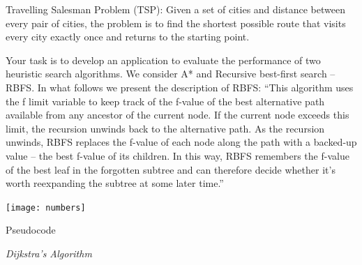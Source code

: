 \documentclass[12pt, a4paper]{article}
\begin{document}
\vspace{20mm}
\begin{flushleft}
\hspace{5mm}
\large
Travelling Salesman Problem (TSP): Given a set of cities and distance between every pair of cities, the problem is to find the shortest possible route that visits every city exactly once and returns to the starting point.
\end{flushleft}

\large
\vspace{5mm}
\begin{flushleft}
\hspace{5mm}
Your task is to develop an application to evaluate the performance of two heuristic
search algorithms.
We consider A* and Recursive best-first search – RBFS. In what follows we
present the description of RBFS:
“This algorithm uses the f limit variable to keep track of the f-value of the
best alternative path available from any ancestor of the current node. If the
current node exceeds this limit, the recursion unwinds back to the alternative
path. As the recursion unwinds, RBFS replaces the f-value of each node along
the path with a backed-up value – the best f-value of its children. In this way,
RBFS remembers the f-value of the best leaf in the forgotten subtree and can
therefore decide whether it’s worth reexpanding the subtree at some later time.”
\end{flushleft}

\vspace{10mm}
\texttt{[image: numbers]}
\\
\centering
\scriptsize
\vspace{2mm}

\newpage

\vspace{20mm}
\centering
\Large 
Pseudocode

\vspace{10mm}
\centering
\large
\textit{Dijkstra's Algorithm}
\vspace{10mm}
\end{document}
